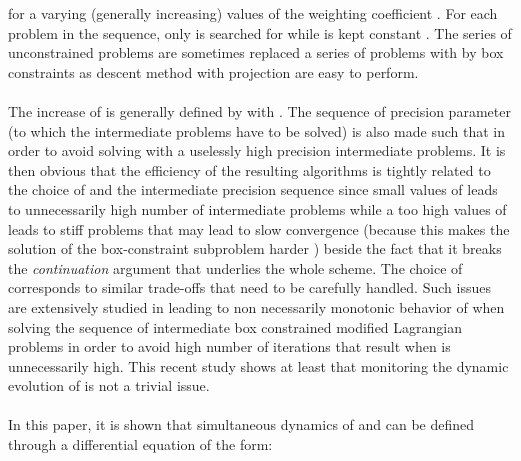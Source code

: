 \documentclass{article}
\begin{document}
for a varying (generally increasing) values of the weighting coefficient . For each problem in the sequence, only  is searched for while  is kept constant \cite{Byrd:99,Birgin:2012}. The series of unconstrained problems are sometimes replaced a series of problems with by box constraints as descent method with projection are easy to perform. \ \\ \ \\ 
The increase of  is generally defined by  with . The sequence of precision parameter  (to which the intermediate problems have to be solved) is also made such that  in order to avoid solving with a uselessly high precision intermediate problems. It is then obvious that the efficiency of the resulting algorithms is tightly related to the choice of  and the intermediate precision sequence  since small values of  leads to unnecessarily high number of intermediate problems while a too high values of  leads to stiff problems that may lead to slow convergence (because this makes the solution of the box-constraint subproblem harder \cite{Birgin:2012}) beside the fact that it breaks the {\em continuation} argument that underlies the whole scheme. The choice of  corresponds to similar trade-offs that need to be carefully handled. Such issues are extensively studied in \cite{Birgin:2012} leading to non necessarily monotonic behavior of  when solving the sequence of intermediate box constrained modified Lagrangian problems in order to avoid high number of iterations that result when  is unnecessarily high. This recent study \cite{Birgin:2012} shows at least that monitoring the dynamic evolution of  is not a trivial issue.\ \\ \ \\ 
In this paper, it is shown that simultaneous dynamics of  and  can be defined through a differential equation of the form:
 
\end{document}
